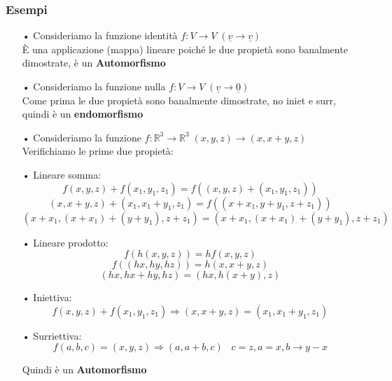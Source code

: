 \subsubsection{Esempi}
\begin{itemize}
\item[•] Consideriamo la funzione identità $f: V \rightarrow V \; (\underline{v} \rightarrow \underline{v})$\\
È una applicazione (mappa) lineare poiché le due propietà sono banalmente dimostrate, è un \textbf{Automorfismo}

\item[•] Consideriamo la funzione nulla $f: V \rightarrow V \; (\underline{v} \rightarrow \underline{0})$\\
Come prima le due propietà sono banalmente dimostrate, no iniet e surr, quindi è un \textbf{endomorfismo}

\item[•] Consideriamo la funzione $f: \mathbb{R}^3 \rightarrow \mathbb{R}^3 \; (x,y,z) \rightarrow (x,x+y,z)$\\
Verifichiamo le prime due propietà:

\subitem • Lineare somma:
$$ f(x,y,z)+f(x_1,y_1,z_1) = f((x,y,z)+(x_1,y_1,z_1)) $$
$$ (x,x+y,z)+(x_1,x_1+y_1,z_1) = f((x+x_1,y+y_1,z+z_1))$$
$$ (x+x_1,(x+x_1)+(y+y_1),z+z_1) = (x+x_1,(x+x_1)+(y+y_1),z+z_1) $$

\subitem • Lineare prodotto:
$$ f(h(x,y,z)) = hf(x,y,z)$$
$$ f((hx,hy,hz)) = h(x,x+y,z)$$
$$ (hx,hx+hy,hz) = (hx,h(x+y),z)$$

\subitem • Iniettiva:
$$ f(x,y,z) + f(x_1,y_1,z_1) \Rightarrow (x,x+y,z) = (x_1,x_1+y_1,z_1) $$

\subitem • Surriettiva:
$$ f(a,b,c) = (x,y,z) \Rightarrow (a,a+b,c) \; \;\; c=z, a=x, b \rightarrow y-x$$

Quindi è un \textbf{Automorfismo}

\end{itemize}


